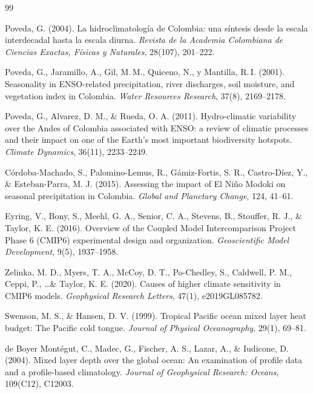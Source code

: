 \documentclass[12pt, a4paper]{article}
\begin{document}
\begin{thebibliography}{99}
	
	Poveda, G. (2004).
	La hidroclimatolog\'ia de Colombia: una s\'intesis desde la escala interdecadal hasta la escala diurna.
	\textit{Revista de la Academia Colombiana de Ciencias Exactas, F\'isicas y Naturales}, 28(107), 201--222.
	
	Poveda, G., Jaramillo, A., Gil, M.\,M., Quiceno, N., y Mantilla, R.\,I. (2001).
	Seasonality in ENSO-related precipitation, river discharges, soil moisture, and vegetation index in Colombia.
	\textit{Water Resources Research}, 37(8), 2169--2178.
	
	Poveda, G., Alvarez, D. M., \& Rueda, O. A. (2011).
	Hydro-climatic variability over the Andes of Colombia associated with ENSO: a review of climatic processes and their impact on one of the Earth's most important biodiversity hotspots.
	\textit{Climate Dynamics}, 36(11), 2233--2249.
	
	C\'ordoba-Machado, S., Palomino-Lemus, R., Gámiz-Fortis, S. R., Castro-D\'iez, Y., \& Esteban-Parra, M. J. (2015).
	Assessing the impact of El Ni\~no Modoki on seasonal precipitation in Colombia.
	\textit{Global and Planetary Change}, 124, 41--61.
	
	Eyring, V., Bony, S., Meehl, G. A., Senior, C. A., Stevens, B., Stouffer, R. J., \& Taylor, K. E. (2016).
	Overview of the Coupled Model Intercomparison Project Phase 6 (CMIP6) experimental design and organization.
	\textit{Geoscientific Model Development}, 9(5), 1937--1958.
	
	Zelinka, M. D., Myers, T. A., McCoy, D. T., Po-Chedley, S., Caldwell, P. M., Ceppi, P., \ldots \& Taylor, K. E. (2020).
	Causes of higher climate sensitivity in CMIP6 models.
	\textit{Geophysical Research Letters}, 47(1), e2019GL085782.
	
	Swenson, M. S., \& Hansen, D. V. (1999).
	Tropical Pacific ocean mixed layer heat budget: The Pacific cold tongue.
	\textit{Journal of Physical Oceanography}, 29(1), 69--81.
	
	de Boyer Mont\'egut, C., Madec, G., Fischer, A. S., Lazar, A., \& Iudicone, D. (2004).
	Mixed layer depth over the global ocean: An examination of profile data and a profile-based climatology.
	\textit{Journal of Geophysical Research: Oceans}, 109(C12), C12003.
	

\end{thebibliography}
\end{document}
